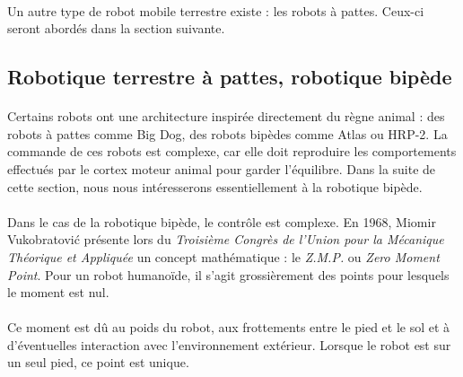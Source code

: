 \documentclass[a4paper,10pt]{article}
\begin{document}
            \paragraph{}
                Un autre type de robot mobile terrestre existe : les robots à pattes. Ceux-ci seront 
                abordés dans la section suivante.
                
        \subsection{Robotique terrestre à pattes, robotique bipède}
            \paragraph{}
                Certains robots ont une architecture inspirée directement du règne animal : 
                des robots à pattes comme Big Dog, des robots bipèdes comme Atlas ou HRP-2. 
                La commande de ces robots est complexe, car elle doit reproduire les comportements 
                effectués par le cortex moteur animal pour garder l'équilibre. Dans la suite 
                de cette section, nous nous intéresserons essentiellement à la robotique bipède. 
            
            \paragraph{}
                Dans le cas de la robotique bipède, le contrôle est complexe. En 1968, Miomir Vukobratović
                présente lors du \textit{Troisième Congrès de l'Union pour la Mécanique Théorique et Appliquée} un 
                concept mathématique : le \textit{Z.M.P.} ou \textit{Zero Moment Point}. Pour un robot
                humanoïde, il s'agit grossièrement des points pour lesquels le moment est nul. 
                
            \paragraph{}
                Ce moment est dû au poids du robot, aux frottements entre le pied et le sol et à d'éventuelles
                interaction avec l'environnement extérieur. Lorsque le robot est sur un seul pied, ce point
                est unique. 
                
\end{document}
